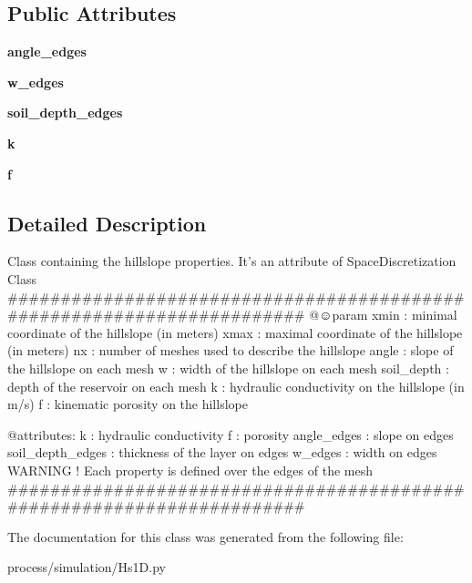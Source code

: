 \subsection*{Public Attributes}
\begin{DoxyCompactItemize}
\item 
\hypertarget{class_hs1_d_1_1_hs1_d_afa750ce5872c1ac79c30fbacd814d9dc}{}\label{class_hs1_d_1_1_hs1_d_afa750ce5872c1ac79c30fbacd814d9dc} 
{\bfseries angle\+\_\+edges}
\item 
\hypertarget{class_hs1_d_1_1_hs1_d_a71848087a0eaac7de043027b19f54545}{}\label{class_hs1_d_1_1_hs1_d_a71848087a0eaac7de043027b19f54545} 
{\bfseries w\+\_\+edges}
\item 
\hypertarget{class_hs1_d_1_1_hs1_d_a4d1deaffe02916f21684764b9720d7dd}{}\label{class_hs1_d_1_1_hs1_d_a4d1deaffe02916f21684764b9720d7dd} 
{\bfseries soil\+\_\+depth\+\_\+edges}
\item 
\hypertarget{class_hs1_d_1_1_hs1_d_a4de82095ad48fe85c6c090328f51503d}{}\label{class_hs1_d_1_1_hs1_d_a4de82095ad48fe85c6c090328f51503d} 
{\bfseries k}
\item 
\hypertarget{class_hs1_d_1_1_hs1_d_a02cd319218a500edd69c52c74a6404b7}{}\label{class_hs1_d_1_1_hs1_d_a02cd319218a500edd69c52c74a6404b7} 
{\bfseries f}
\end{DoxyCompactItemize}


\subsection{Detailed Description}
\begin{DoxyVerb}    Class containing the hillslope properties. It's an attribute of
    SpaceDiscretization Class
    #######################################################################
    @☺param
        xmin : minimal coordinate of the hillslope (in meters)
        xmax : maximal coordinate of the hillslope (in meters)
        nx : number of meshes used to describe the hillslope
        angle : slope of the hillslope on each mesh
        w : width of the hillslope on each mesh
        soil_depth : depth of the reservoir on each mesh
        k : hydraulic conductivity on the hillslope (in m/s)
        f : kinematic porosity on the hillslope

    @attributes:
      k : hydraulic conductivity
      f : porosity
      angle_edges : slope on edges
      soil_depth_edges : thickness of the layer on edges
      w_edges : width on edges
    WARNING ! Each property is defined over the edges of the mesh
    #######################################################################
\end{DoxyVerb}
 

The documentation for this class was generated from the following file\+:\begin{DoxyCompactItemize}
\item 
process/simulation/Hs1\+D.\+py\end{DoxyCompactItemize}
